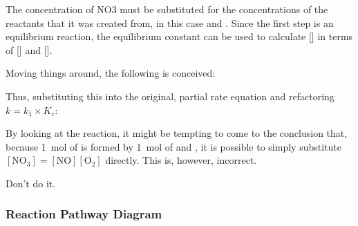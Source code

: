 
				The concentration of NO3 must be substituted for the concentrations of the reactants that it was created from, in this case
				 and . Since the first step is an equilibrium reaction, the equilibrium constant \Kc can be used to calculate
				[] in terms of [] and [].

				\txtdiagram{
					\[K_{c} = \frac{[\mathrm{NO}_{3}]}{[\mathrm{NO}][\mathrm{O}_{2}]}\]
				}{}

				\pagebreak
				Moving things around, the following is conceived:

				\txtdiagram{
					\[[\mathrm{NO}_{3}] = K_{c}[\mathrm{NO}][\mathrm{O}_{2}]\]
				}{}

				Thus, substituting this into the original, partial rate equation and refactoring $k = k_{1} \times K_{c}$:

				\txtdiagram{
					\[\mathrm{Rate} = k_{1}K_{c}[\mathrm{NO}][\mathrm{O}_{2}][\mathrm{NO}] = k[NO]^{2}[O_{2}]\]
				}{}


				By looking at the reaction, it might be tempting to come to the conclusion that, because \SI{1}{\mole} of  is formed by
				\SI{1}{\mole} of  and , it is possible to simply substitute $[\mathrm{NO}_{3}] = [\mathrm{NO}][\mathrm{O}_{2}]$ directly.
				This is, however, incorrect.

				Don't do it.



			\subsubsection{Reaction Pathway Diagram}


